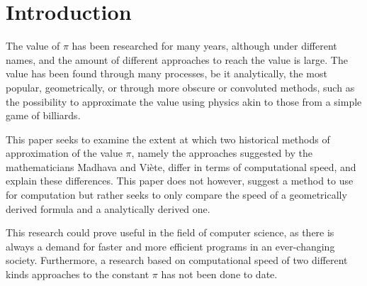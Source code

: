 \section{Introduction}

The value of $\pi$ has been researched for many years, although under different names, and the amount of different approaches to reach the value is large. The value has been found through many processes, be it analytically, the most popular, geometrically, or through more obscure or convoluted methods, such as the possibility to approximate the value using physics akin to those from a simple game of billiards. \cite{galperin_2003}

This paper seeks to examine the extent at which two historical methods of approximation of the value $\pi$, namely the approaches suggested by the mathematicians Madhava and Viète, differ in terms of computational speed, and explain these differences. This paper does not however, suggest a method to use for computation but rather seeks to only compare the speed of a geometrically derived formula and a analytically derived one.

This research could prove useful in the field of computer science, as there is always a demand for faster and more efficient programs in an ever-changing society. Furthermore, a research based on computational speed of two different kinds approaches to the constant $\pi$ has not been done to date.